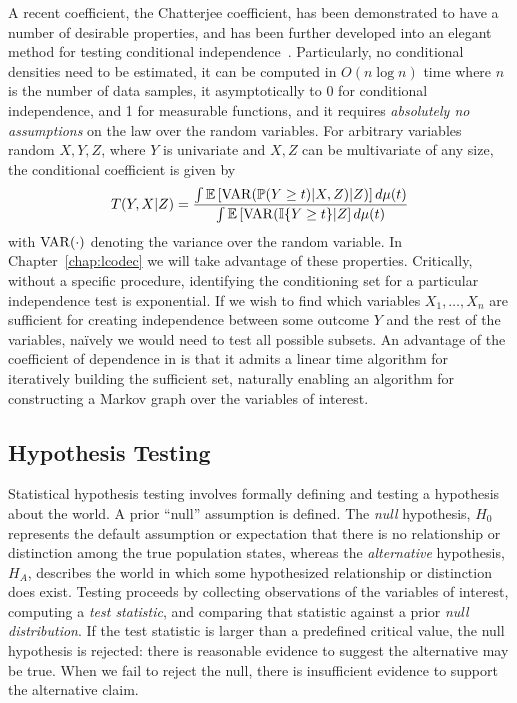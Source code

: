 A recent coefficient, the Chatterjee coefficient, has been demonstrated to have a number of desirable properties, and has been further developed into an elegant method for testing conditional independence~\citep{chatterjee2020new,codec}. 
Particularly,
no conditional densities need to be estimated,
it can be computed in $O(n\log n)$ time where $n$ is the number of data samples,
it asymptotically to 0 for conditional independence, and 1 for measurable functions,
and it requires \textit{absolutely no assumptions} on the law over the random variables.
For arbitrary variables random $X,Y,Z$, where $Y$ is univariate and $X,Z$ can be multivariate of any size, the conditional coefficient is given  by
\begin{align}\label{eq:contcodec}
    T(Y,X|Z) = \frac{\int\mathbb{E}\left[\operatorname*{VAR}(\mathbb{P}(Y\geq t)|X,Z)|Z)\right]d\mu(t)}{\int\mathbb{E}\left[\operatorname*{VAR}(\mathbb{I}\{Y\geq t\}|Z\right] d\mu(t)}
\end{align}
with $\operatorname*{VAR}(\cdot)$ denoting the variance over the random variable.
In Chapter~\ref{chap:lcodec} we will take advantage of these properties. Critically, without a specific procedure, identifying the conditioning set for a particular independence test is exponential. If we wish to find which variables $X_1,\ldots,X_n$ are sufficient for creating independence between some outcome $Y$ and the rest of the variables, na\"ively we would need to test all possible subsets.
An advantage of the coefficient of dependence in \cite{codec} is that it admits a linear time algorithm for iteratively building the sufficient set, naturally enabling an algorithm for constructing a Markov graph over the variables of interest.

\subsection{Hypothesis Testing}

Statistical hypothesis testing involves formally defining and testing a hypothesis about the world.
A prior ``null'' assumption is defined. The \textit{null} hypothesis, $H_0$
represents the default assumption or expectation
that there is no relationship or distinction among
the true population states,
whereas the \textit{alternative} hypothesis, $H_A$,
describes the world in which some hypothesized 
relationship or distinction does exist.
Testing proceeds by collecting observations
of the variables of interest,
computing a \textit{test statistic},
and comparing that statistic against
a prior \textit{null distribution}.
If the test statistic is larger
than a predefined critical value,
the null hypothesis is rejected:
there is reasonable evidence to suggest
the alternative may be true.
When we fail to reject the null,
there is insufficient evidence to support
the alternative claim.

